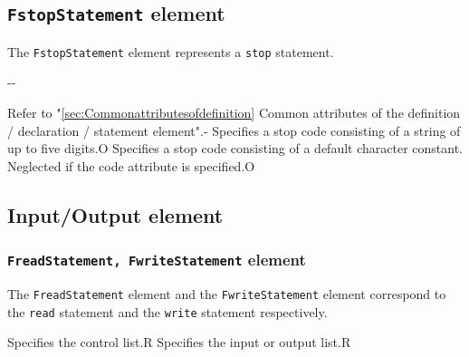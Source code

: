 \subsection{ {\tt FstopStatement} element}

The {\tt FstopStatement} element represents a {\tt stop} statement.


\begin{XcodeMLChildElements}
\XcodeMLElementDef{-}
{-}{-}
\end{XcodeMLChildElements}

\begin{XcodeMLAttributes}
{Refer to "\ref{sec:Commonattributesofdefinition} Common attributes of the definition / declaration / statement element".}{-}
{Specifies a stop code consisting of a string of up to five digits.}{O}
{Specifies a stop code consisting of a default character constant.
 Neglected if the code attribute is specified.}{O}
\end{XcodeMLAttributes}


\subsection{Input/Output element}

\subsubsection{ {\tt FreadStatement, FwriteStatement} element}

The {\tt FreadStatement} element and the {\tt FwriteStatement} element correspond to the {\tt read} statement and the {\tt write} statement respectively.


\begin{XcodeMLChildElements}
{Specifies the control list.}{R}
{Specifies the input or output list.}{R}
\end{XcodeMLChildElements}

